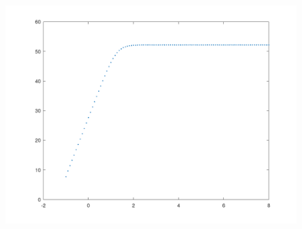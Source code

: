 \FloatBarrier
\begin{figure}
  \includegraphics{GAINVERDADEIRO.png}
  \caption{}
  \label{}
\end{figure}
\FloatBarrier


